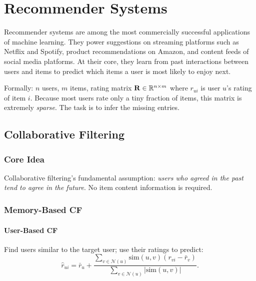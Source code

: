 \chapter{Recommender Systems}

Recommender systems are among the most commercially successful applications of
machine learning. They power suggestions on streaming platforms such as Netflix
and Spotify, product recommendations on Amazon, and content feeds of social
media platforms. At their core, they learn from past interactions between users
and items to predict which items a user is most likely to enjoy next.

Formally: $n$ users, $m$ items, rating matrix $\mathbf{R}\in\mathbb{R}^{n\times m}$
where $r_{ui}$ is user $u$'s rating of item $i$. Because most users rate only
a tiny fraction of items, this matrix is extremely \emph{sparse}. The task is
to infer the missing entries.

\section{Collaborative Filtering}
\label{sec:cf}

\subsection{Core Idea}

Collaborative filtering's fundamental assumption: \emph{users who agreed in the
past tend to agree in the future}. No item content information is required.

\subsection{Memory-Based CF}

\subsubsection{User-Based CF}

Find users similar to the target user; use their ratings to predict:
\begin{equation}
\hat{r}_{ui}=\bar{r}_u+\frac{\sum_{v\in\mathcal{N}(u)}\mathrm{sim}(u,v)(r_{vi}-\bar{r}_v)}
{\sum_{v\in\mathcal{N}(u)}|\mathrm{sim}(u,v)|}.
\end{equation}

